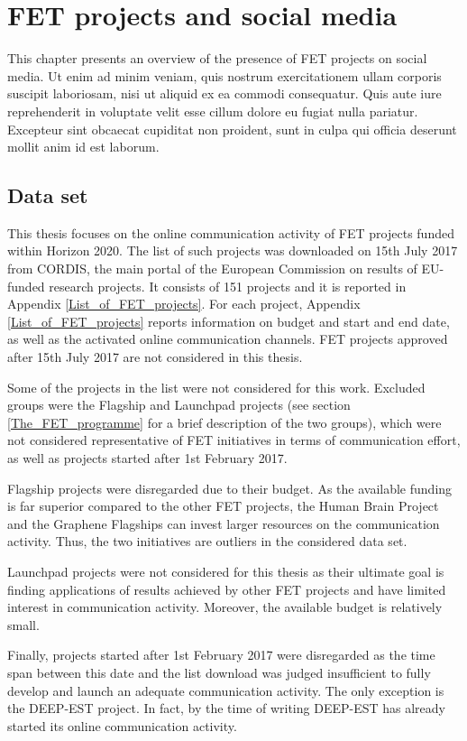\chapter{FET projects and social media}
This chapter presents an overview of the presence of FET projects on social media. Ut enim ad minim veniam, quis nostrum exercitationem ullam corporis suscipit laboriosam, nisi ut aliquid ex ea commodi consequatur. Quis aute iure reprehenderit in voluptate velit esse cillum dolore eu fugiat nulla pariatur. Excepteur sint obcaecat cupiditat non proident, sunt in culpa qui officia deserunt mollit anim id est laborum.

\section{Data set}
This thesis focuses on the online communication activity of FET projects funded within Horizon 2020. The list of such projects was downloaded on 15th July 2017 from CORDIS, the main portal of the European Commission on results of EU-funded research projects. It consists of 151 projects and it is reported in Appendix \ref{List_of_FET_projects}. For each project, Appendix \ref{List_of_FET_projects} reports information on budget and start and end date, as well as the activated online communication channels. FET projects approved after 15th July 2017 are not considered in this thesis.  

Some of the projects in the list were not considered for this work. Excluded groups were the Flagship and Launchpad projects (see section \ref{The_FET_programme} for a brief description of the two groups), which were not considered representative of FET initiatives in terms of communication effort, as well as projects started after 1st February 2017. 

Flagship projects were disregarded due to their budget.  As the available funding is far superior compared to the other FET projects, the Human Brain Project and the Graphene Flagships can invest larger resources on the communication activity. Thus, the two initiatives are outliers in the considered data set. 

Launchpad projects were not considered for this thesis as their ultimate goal is finding applications of results achieved by other FET projects and have limited interest in communication activity. Moreover, the available budget is relatively small. 

Finally, projects started after 1st February 2017 were disregarded as the time span between this date and the list download was judged insufficient to fully develop and launch an adequate communication activity. The only exception is the DEEP-EST project. In fact, by the time of writing DEEP-EST has already started its online communication activity.    

